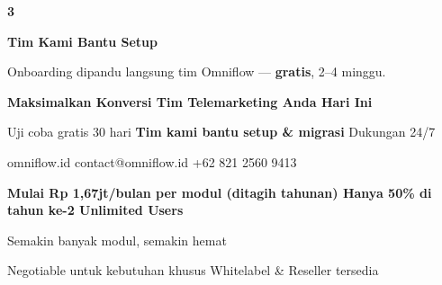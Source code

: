 \documentclass[a4paper]{article}
\begin{document}
\begin{center}
\begin{minipage}[t]{0.318\textwidth}
{\begin{minipage}[t][4.7cm][c]{\dimexpr\linewidth-2\fboxsep\relax}
            \begin{center}
                {\fontsize{22}{26}\selectfont\bfseries\color{BluePrimary} 3}
            \end{center}
            \vspace{2pt}
            \begin{center}
                {\fontsize{10}{13}\selectfont\bfseries\color{BlueDark} Tim Kami Bantu Setup}\par\vspace{3pt}
                {\fontsize{9}{12}\selectfont\color{TextDark} Onboarding dipandu langsung tim Omniflow --- \textbf{gratis}, 2--4 minggu.}
            \end{center}
        \end{minipage}}
\end{minipage}
\end{center}

\vspace{8pt}

{\setlength{\fboxsep}{10pt}\setlength{\fboxrule}{0pt}%
\noindent\colorbox{BluePrimary}{%
    \begin{minipage}{\dimexpr\textwidth-2\fboxsep\relax}
        \centering
        {\fontsize{13}{16}\selectfont\bfseries\color{White}
        Maksimalkan Konversi Tim Telemarketing Anda Hari Ini}\par\vspace{3pt}
        {\fontsize{9.5}{12}\selectfont\color{BlueMid}
        Uji coba gratis 30 hari \enspace\textbullet\enspace \textbf{Tim kami bantu setup \& migrasi} \enspace\textbullet\enspace Dukungan 24/7}\par\vspace{2pt}
        {\fontsize{9.5}{12}\selectfont\color{BlueLight}
        omniflow.id \enspace\textbullet\enspace contact@omniflow.id \enspace\textbullet\enspace +62 821 2560 9413}
    \end{minipage}}}


\vspace{6pt}

{\setlength{\fboxsep}{8pt}\setlength{\fboxrule}{0pt}%
\noindent\colorbox{BlueBg}{%
    \begin{minipage}{\dimexpr\textwidth-2\fboxsep\relax}
        \centering
        {\fontsize{9}{12}\selectfont\bfseries\color{BluePrimary}
        Mulai Rp 1,67jt/bulan per modul (ditagih tahunan) \enspace\textbullet\enspace Hanya 50\% di tahun ke-2 \enspace\textbullet\enspace Unlimited Users}\par\vspace{1pt}
        {\fontsize{8.5}{11}\selectfont\color{BlueDark}
        Semakin banyak modul, semakin hemat}\par\vspace{1pt}
        {\fontsize{8}{10}\selectfont\color{TextLight}
        Negotiable untuk kebutuhan khusus \enspace\textbullet\enspace Whitelabel \& Reseller tersedia}
    \end{minipage}}}

\restoregeometry
\pagestyle{empty}
\end{document}

